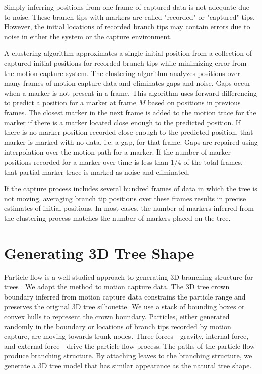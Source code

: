 Simply inferring positions from one frame of captured data is not adequate due to noise. These branch tips with markers are called "recorded" or "captured" tips. However, the initial locations of recorded branch tips may contain errors due to noise in either the system or the capture environment. 

A clustering algorithm approximates a single initial position from a collection of captured initial positions for recorded branch tips while minimizing error from the motion capture system. The clustering algorithm analyzes positions over many frames of motion capture data and eliminates gaps and noise. Gaps occur when a marker is not present in a frame. This algorithm uses forward differencing to predict a position for a marker at frame $M$ based on positions in previous frames. The closest marker in the next frame is added to the motion trace for the marker if there is a marker located close enough to the predicted position. If there is no marker position recorded close enough to the predicted position, that marker is marked with no data, i.e. a gap, for that frame. Gaps are repaired using interpolation over the motion path for a marker. If the number of marker positions recorded for a marker over time is less than $1/4$ of the total frames, that partial marker trace is marked as noise and eliminated.

If the capture process includes several hundred frames of data in which the tree is not moving, averaging branch tip positions over these frames results in precise estimates of initial positions. In most cases, the number of markers inferred from the clustering process matches the number of markers placed on the tree.

\section{Generating 3D Tree Shape}

Particle flow is a well-studied approach to generating 3D branching structure for trees \cite{Reeves83particlesystems,Runions07,palubicki:siggraph09,neubert:acmtg07}. We adapt the method to motion capture data. The 3D tree crown boundary inferred from motion capture data constrains the particle range and preserves the original 3D tree silhouette. We use a stack of bounding boxes or convex hulls to represent the crown boundary. Particles, either generated randomly in the boundary or locations of branch tips recorded by motion capture, are moving towards trunk nodes. Three forces---gravity, internal force, and external force---drive the particle flow process. The paths of the particle flow produce branching structure. By attaching leaves to the branching structure, we generate a 3D tree model that has similar appearance as the natural tree shape. 

